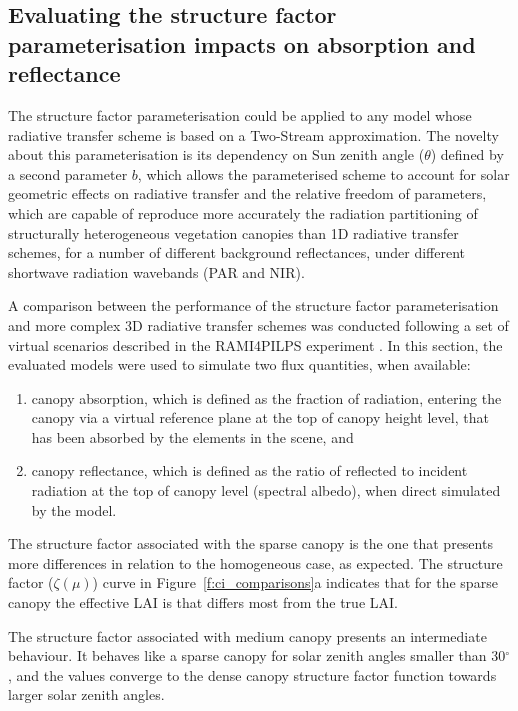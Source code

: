 \documentclass[a4paper,11pt]{report}
\begin{document}
\subsection{Evaluating the structure factor parameterisation impacts on absorption and reflectance}
The structure factor parameterisation could be applied to any model whose radiative transfer scheme is based on a Two-Stream approximation. The novelty about this parameterisation is its dependency on Sun zenith angle ($\theta$) defined by a second parameter $b$, which allows the parameterised scheme to account for solar geometric effects on radiative transfer and the relative freedom of parameters, which are capable of reproduce more accurately the radiation partitioning of structurally heterogeneous vegetation canopies than 1D radiative transfer schemes, for a number of different background reflectances, under different shortwave radiation wavebands (PAR and NIR). 

A comparison between the performance of the structure factor parameterisation and more complex 3D radiative transfer schemes was conducted following a set of virtual scenarios described in the RAMI4PILPS experiment \citep{Widlowski2011}. In this section, the evaluated models were used to simulate two flux quantities, when available: 
\begin{enumerate}[i]
\item canopy absorption, which is defined as the fraction of radiation, entering the canopy via a virtual reference plane at the top of canopy height level, that has been absorbed by the elements in the scene, and 
\item canopy reflectance, which is defined as the ratio of reflected to incident radiation at the top of canopy level (spectral albedo), when direct simulated by the model.
\end{enumerate}

The structure factor associated with the sparse canopy is the one that presents more differences in relation to the homogeneous case, as expected. The structure factor ($\zeta(\mu)$) curve in Figure~\ref{f:ci_comparisons}a indicates that for the sparse canopy the effective LAI is that differs most from the true LAI. 

The structure factor associated with medium canopy presents an intermediate behaviour. It behaves like a sparse canopy for solar zenith angles smaller than 30$^{\circ}$, and the values converge to the dense canopy structure factor function towards larger solar zenith angles. 
\end{document}
